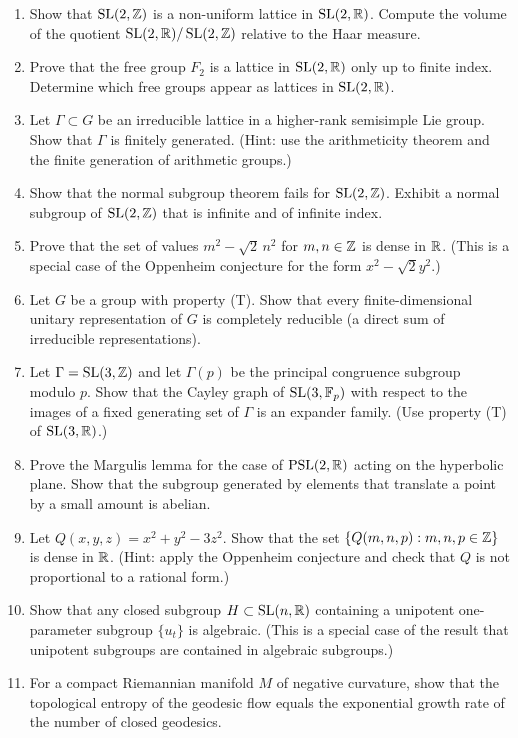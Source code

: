 \begin{enumerate}
    \item [I] Show that \(\operatorname{SL}(2,\mathbb{Z})\) is a non-uniform lattice in \(\operatorname{SL}(2,\mathbb{R})\). Compute the volume of the quotient \(\operatorname{SL}(2,\mathbb{R})/\operatorname{SL}(2,\mathbb{Z})\) relative to the Haar measure.
    \item [I] Prove that the free group \(F_2\) is a lattice in \(\operatorname{SL}(2,\mathbb{R})\) only up to finite index. Determine which free groups appear as lattices in \(\operatorname{SL}(2,\mathbb{R})\).
    \item [I] Let \(\Gamma \subset G\) be an irreducible lattice in a higher-rank semisimple Lie group. Show that \(\Gamma\) is finitely generated. (Hint: use the arithmeticity theorem and the finite generation of arithmetic groups.)
    \item [I] Show that the normal subgroup theorem fails for \(\operatorname{SL}(2,\mathbb{Z})\). Exhibit a normal subgroup of \(\operatorname{SL}(2,\mathbb{Z})\) that is infinite and of infinite index.
    \item [I] Prove that the set of values \(m^2 - \sqrt{2}\, n^2\) for \(m,n \in \mathbb{Z}\) is dense in \(\mathbb{R}\). (This is a special case of the Oppenheim conjecture for the form \(x^2 - \sqrt{2} y^2\).)
    \item [I] Let \(G\) be a group with property (T). Show that every finite-dimensional unitary representation of \(G\) is completely reducible (a direct sum of irreducible representations).
    \item [I] Let \(\Gamma = \operatorname{SL}(3,\mathbb{Z})\) and let \(\Gamma(p)\) be the principal congruence subgroup modulo \(p\). Show that the Cayley graph of \(\operatorname{SL}(3,\mathbb{F}_p)\) with respect to the images of a fixed generating set of \(\Gamma\) is an expander family. (Use property (T) of \(\operatorname{SL}(3,\mathbb{R})\).)
    \item [B] Prove the Margulis lemma for the case of \(\operatorname{PSL}(2,\mathbb{R})\) acting on the hyperbolic plane. Show that the subgroup generated by elements that translate a point by a small amount is abelian.
    \item [I] Let \(Q(x,y,z) = x^2 + y^2 - 3z^2\). Show that the set \(\{Q(m,n,p) : m,n,p \in \mathbb{Z}\}\) is dense in \(\mathbb{R}\). (Hint: apply the Oppenheim conjecture and check that \(Q\) is not proportional to a rational form.)
    \item [A] Show that any closed subgroup \(H \subset \operatorname{SL}(n,\mathbb{R})\) containing a unipotent one-parameter subgroup \(\{u_t\}\) is algebraic. (This is a special case of the result that unipotent subgroups are contained in algebraic subgroups.)
    \item [I] For a compact Riemannian manifold \(M\) of negative curvature, show that the topological entropy of the geodesic flow equals the exponential growth rate of the number of closed geodesics.

\end{enumerate}
